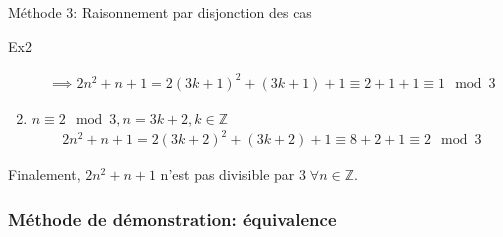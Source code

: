 \begin{parag}{Méthode 3: Raisonnement par disjonction des cas}
\begin{subparag}{Ex2}
\begin{enumerate}
            \begin{align*}
                \implies 2n^2 + n + 1 = 2(3k + 1) ^2 + (3k + 1) + 1 \equiv 2 + 1 + 1 \equiv 1 \mod 3
            \end{align*}
            \item $n \equiv 2 \mod 3, n = 3k + 2, k \in \mathbb{Z}$
            \begin{align*}
                2n^2 + n + 1 = 2(3k + 2)^2 + (3k + 2) + 1\equiv  8 + 2 + 1 \equiv 2 \mod3
            \end{align*}
        \end{enumerate}
        Finalement, $2n^2 + n + 1$ n'est pas divisible par $3 \; \forall n  \in \mathbb{Z}$.
    \end{subparag}
\end{parag}
\subsubsection{Méthode de démonstration: équivalence}

